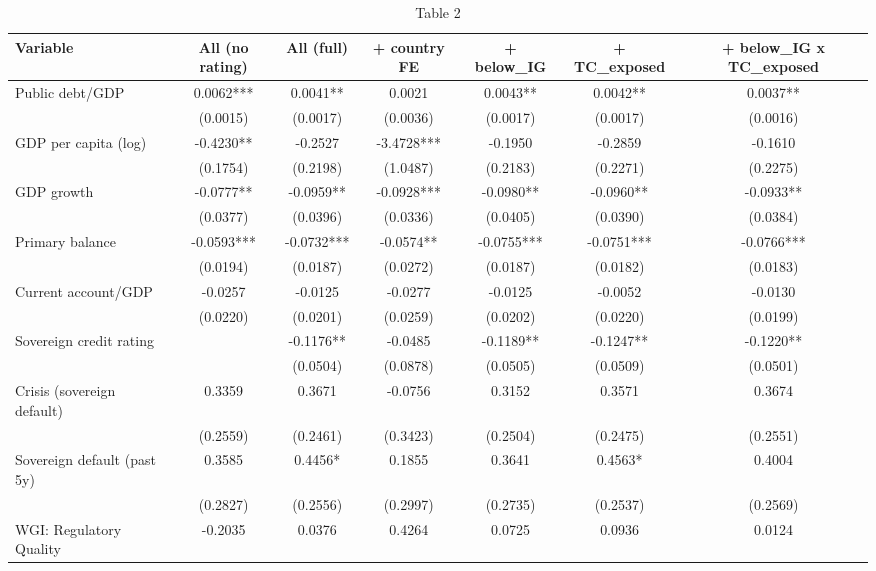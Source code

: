\documentclass[10pt]{article}
\begin{document}
\thispagestyle{empty}
\begin{table}[h!]
  \centering
  \scriptsize
  \caption{Table 2}
  \label{coupon-table2-iso-dummies-global}
  \begin{threeparttable}
  \begin{tabular}{lcccccc}
    \toprule
    Variable & All (no rating) & All (full) & + country FE & + below\_IG & + TC\_exposed & + below\_IG x TC\_exposed \\
    \midrule
    Public debt/GDP & 0.0062*** & 0.0041** & 0.0021 & 0.0043** & 0.0042** & 0.0037** \\
     & (0.0015) & (0.0017) & (0.0036) & (0.0017) & (0.0017) & (0.0016) \\[2pt]
    GDP per capita (log) & -0.4230** & -0.2527 & -3.4728*** & -0.1950 & -0.2859 & -0.1610 \\
     & (0.1754) & (0.2198) & (1.0487) & (0.2183) & (0.2271) & (0.2275) \\[2pt]
    GDP growth & -0.0777** & -0.0959** & -0.0928*** & -0.0980** & -0.0960** & -0.0933** \\
     & (0.0377) & (0.0396) & (0.0336) & (0.0405) & (0.0390) & (0.0384) \\[2pt]
    Primary balance & -0.0593*** & -0.0732*** & -0.0574** & -0.0755*** & -0.0751*** & -0.0766*** \\
     & (0.0194) & (0.0187) & (0.0272) & (0.0187) & (0.0182) & (0.0183) \\[2pt]
    Current account/GDP & -0.0257 & -0.0125 & -0.0277 & -0.0125 & -0.0052 & -0.0130 \\
     & (0.0220) & (0.0201) & (0.0259) & (0.0202) & (0.0220) & (0.0199) \\[2pt]
    Sovereign credit rating &  & -0.1176** & -0.0485 & -0.1189** & -0.1247** & -0.1220** \\
     &  & (0.0504) & (0.0878) & (0.0505) & (0.0509) & (0.0501) \\[2pt]
    Crisis (sovereign default) & 0.3359 & 0.3671 & -0.0756 & 0.3152 & 0.3571 & 0.3674 \\
     & (0.2559) & (0.2461) & (0.3423) & (0.2504) & (0.2475) & (0.2551) \\[2pt]
    Sovereign default (past 5y) & 0.3585 & 0.4456* & 0.1855 & 0.3641 & 0.4563* & 0.4004 \\
     & (0.2827) & (0.2556) & (0.2997) & (0.2735) & (0.2537) & (0.2569) \\[2pt]
    WGI: Regulatory Quality & -0.2035 & 0.0376 & 0.4264 & 0.0725 & 0.0936 & 0.0124 \\

\end{tabular}
\end{threeparttable}
\end{table}
\end{document}
